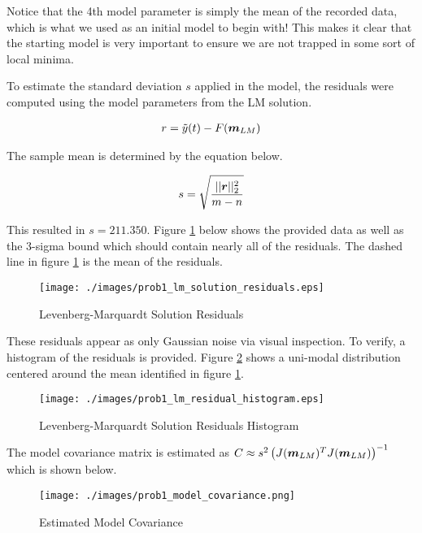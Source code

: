 Notice that the 4th model parameter is simply the mean of the recorded data, which is what we used as an initial model to begin with! This makes it clear that the starting model is very important to ensure we are not trapped in some sort of local minima. 

To estimate the standard deviation $s$ applied in the model, the residuals were computed using the model parameters from the LM solution. 

\begin{align*}
	r = \tilde{y}(t) - F(\boldsymbol{m}_{LM})
\end{align*}

The sample mean is determined by the equation below. 

\begin{align*}
	s = \sqrt{\frac{|| {\boldsymbol{r}} ||_2^2}{m - n}}
\end{align*}

This resulted in $s = 211.350$. Figure \ref{fig: prob1 lm solution residuals} below shows the provided data as well as the 3-sigma bound which should contain nearly all of the residuals. The dashed line in figure \ref{fig: prob1 lm solution residuals} is the mean of the residuals. 

\begin{figure}[h] 
	\centering
	\texttt{[image: ./images/prob1\_lm\_solution\_residuals.eps]}
	\caption{Levenberg-Marquardt Solution Residuals}
	\label{fig: prob1 lm solution residuals}
\end{figure}
\FloatBarrier

These residuals appear as only Gaussian noise via visual inspection. To verify, a histogram of the residuals is provided. Figure \ref{fig: prob1 lm solution residuals histogram} shows a uni-modal distribution centered around the mean identified in figure \ref{fig: prob1 lm solution residuals}.

\begin{figure}[h] 
	\centering
	\texttt{[image: ./images/prob1\_lm\_residual\_histogram.eps]}
	\caption{Levenberg-Marquardt Solution Residuals Histogram}
	\label{fig: prob1 lm solution residuals histogram}
\end{figure}
\FloatBarrier

The model covariance matrix is estimated as $C \approx s^2 \left(J(\boldsymbol{m}_{LM})^T J(\boldsymbol{m}_{LM})\right)^{-1}$ which is shown below. 

\begin{figure}[h] 
	\centering
	\texttt{[image: ./images/prob1\_model\_covariance.png]}
	\caption{Estimated Model Covariance}
	\label{fig: prob1 model covariance}
\end{figure}
\FloatBarrier

